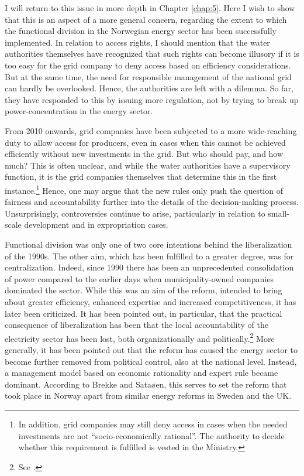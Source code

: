 I will return to this issue in more depth in Chapter \ref{chap:5}. Here I wish to show that this is an aspect of a more general concern, regarding the extent to which the functional division in the Norwegian energy sector has been successfully implemented. In relation to access rights, I should mention that the water authorities themselves have recognized that such rights can become illusory if it is too easy for the grid company to deny access based on efficiency considerations. But at the same time, the need for responsible management of the national grid can hardly be overlooked. Hence, the authorities are left with a dilemma. So far, they have responded to this by issuing more regulation, not by trying to break up power-concentration in the energy sector.

From 2010 onwards, grid companies have been subjected to a more wide-reaching duty to allow access for producers, even in cases when this cannot be achieved efficiently without new investments in the grid. But who should pay, and how much? This is often unclear, and while the water authorities have a supervisory function, it is the grid companies themselves that determine this in the first instance.\footnote{In addition, grid companies may still deny access in cases when the needed investments are not ``socio-economically rational''. The authority to decide whether this requirement is fulfilled is vested in the Ministry.} Hence, one may argue that the new rules only push the question of fairness and accountability further into the details of the decision-making process. Unsurprisingly, controversies continue to arise, particularly in relation to small-scale development and in expropriation cases.

Functional division was only one of two core intentions behind the liberalization of the 1990s. The other aim, which has been fulfilled to a greater degree, was for centralization. Indeed, since 1990 there has been an unprecedented consolidation of power compared to the earlier days when municipality-owned companies dominated the sector. While this was an aim of the reform, intended to bring about greater efficiency, enhanced expertise and increased competitiveness, it has later been criticized. It has been pointed out, in particular, that the practical consequence of liberalization has been that the local accountability of the electricity sector has been lost, both organizationally and politically.\footnote{See \cite{agnell11}.} More generally, it has been pointed out that the reform has caused the energy sector to become further removed from political control, also at the national level. Instead, a management model based on economic rationality and expert rule became dominant. According to Brekke and Sataøen, this serves to set the reform that took place in Norway apart from similar energy reforms in Sweden and the UK. 

